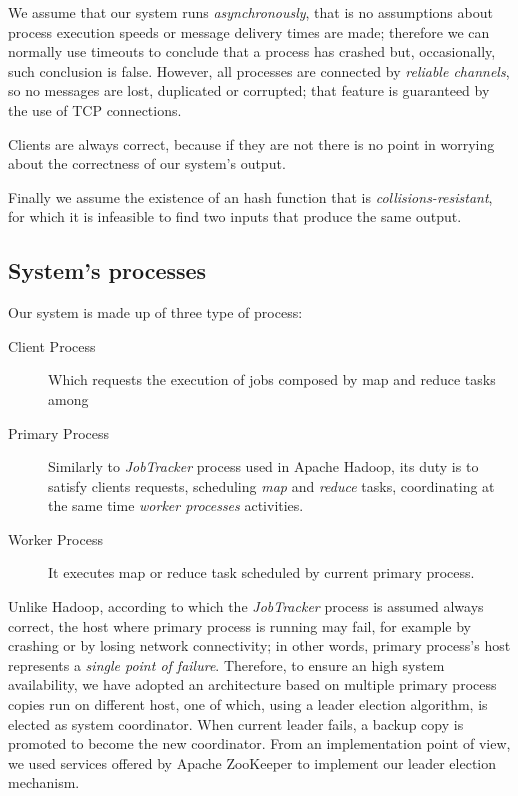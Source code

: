 \documentclass[sigchi]{acmart}
\begin{document}
We assume that our system runs \textit{asynchronously}, that is no assumptions about process execution speeds or message delivery times are made; therefore we can normally use timeouts to conclude that a process has crashed but, occasionally, such conclusion is false. However, all processes are connected by \textit{reliable channels}, so no messages are lost, duplicated or corrupted; that feature is guaranteed by the use of TCP connections. 

Clients are always correct, because if they are not there is no point in worrying about the correctness of our system's output.

Finally we assume the existence of an hash function that is \textit{collisions-resistant}, for which it is infeasible to find two inputs that produce the same output.

\subsection{System's processes}

Our system is made up of three type of process:

\begin{description}
\item[Client Process] Which requests the execution of jobs composed by map and reduce tasks among

\item[Primary Process] Similarly to \textit{JobTracker} process used in Apache Hadoop, its duty is to satisfy clients requests, scheduling \textit{map} and \textit{reduce} tasks, coordinating at the same time \textit{worker processes} activities. 

\item[Worker Process] It executes map or reduce task scheduled by current primary process.
\end{description}

Unlike Hadoop, according to which the \textit{JobTracker} process is assumed always correct, the host where primary process is running may fail, for example by crashing or by losing network connectivity; in other words, primary process's host represents a \textit{single point of failure}. Therefore, to ensure an high system availability, we have adopted an architecture based on multiple primary process copies run on different host, one of which, using a leader election algorithm, is elected as system coordinator. When current leader fails, a backup copy is promoted to become the new coordinator. From an implementation point of view, we used services offered by Apache ZooKeeper to implement our leader election mechanism.
\end{document}
